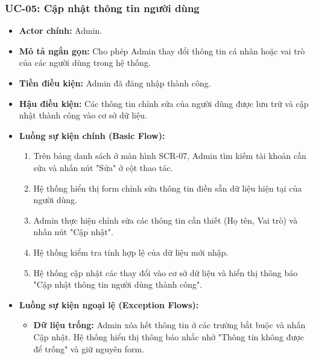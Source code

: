 \subsubsection{UC-05: Cập nhật thông tin người dùng}
\label{subsubsec:uc05_update_user}
\begin{itemize}
    \item \textbf{Actor chính:} Admin.
    \item \textbf{Mô tả ngắn gọn:} Cho phép Admin thay đổi thông tin cá nhân hoặc vai trò của các người dùng trong hệ thống.
    \item \textbf{Tiền điều kiện:} Admin đã đăng nhập thành công.
    \item \textbf{Hậu điều kiện:} Các thông tin chỉnh sửa của người dùng được lưu trữ và cập nhật thành công vào cơ sở dữ liệu.
    \item \textbf{Luồng sự kiện chính (Basic Flow):}
        \begin{enumerate}
            \item Trên bảng danh sách ở màn hình SCR-07, Admin tìm kiếm tài khoản cần sửa và nhấn nút "Sửa" ở cột thao tác.
            \item Hệ thống hiển thị form chỉnh sửa thông tin điền sẵn dữ liệu hiện tại của người dùng.
            \item Admin thực hiện chỉnh sửa các thông tin cần thiết (Họ tên, Vai trò) và nhấn nút "Cập nhật".
            \item Hệ thống kiểm tra tính hợp lệ của dữ liệu mới nhập.
            \item Hệ thống cập nhật các thay đổi vào cơ sở dữ liệu và hiển thị thông báo "Cập nhật thông tin người dùng thành công".
        \end{enumerate}
    \item \textbf{Luồng sự kiện ngoại lệ (Exception Flows):}
        \begin{itemize}
            \item \textbf{Dữ liệu trống:} Admin xóa hết thông tin ở các trường bắt buộc và nhấn Cập nhật. Hệ thống hiển thị thông báo nhắc nhở "Thông tin không được để trống" và giữ nguyên form.
        \end{itemize}
\end{itemize}

